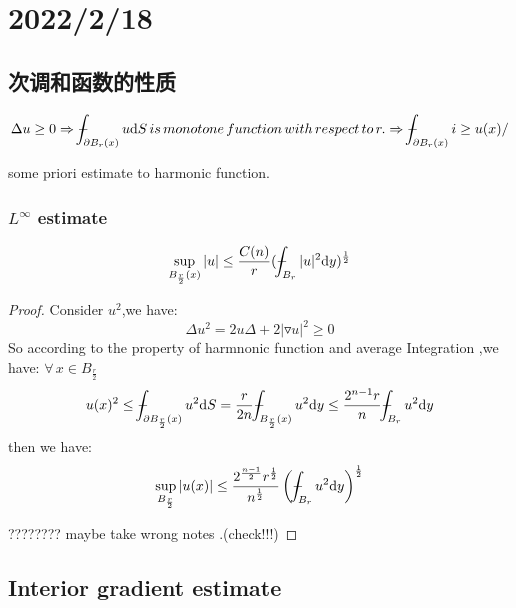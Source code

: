\section{2022/2/18}

\subsection{次调和函数的性质}
\begin{equation*}
    \Delta u\geq 0 \Rightarrow \dashint_{\partial B_r (x)} u\dd S \, is \, monotone \, function \, with \, respect \, to \,r .\Rightarrow \dashint_{\partial B_r (x)} i\geq u(x)/ 
\end{equation*}

some priori estimate to harmonic function.

\subsubsection{$L^{\infty }$ estimate}

\begin{equation*}
    \sup_{B_{\frac{r}{2}}(x)}|u|\leq \frac{C(n)}{r}(\dashint_{B_r}|u|^2 \dd y)^{\frac{1}{2}}
\end{equation*}

\begin{proof}
    Consider $u^2$,we have:
    \begin{equation*}
        \Delta u^2=2u\Delta +2|\triangledown u|^2\geq 0
    \end{equation*}
    So according to the property of harmnonic function and average Integration ,we have:
    $\forall \, x\in B_{\frac{r}{2}}$
    \begin{equation*}
        u(x)^2\leq \dashint_{\partial B_{\frac{r}{2}}(x)}u^2 \dd S=\frac{r}{2n} 
        \dashint_{B_{\frac{r}{2}}(x)}u^2 \dd y \leq \frac{2^{n-1}r}{n}\dashint_{B_r}u^2 \dd y  
    \end{equation*}
then we have:
\begin{equation*}
    \sup_{B_{\frac{r}{2}}}|u(x)|\leq \frac{2^{\frac{n-1}{2}}r^{\frac{1}{2}}}{n^{\frac{1}{2}}}\left(\dashint_{B_r}u^2\dd y\right)^{\frac{1}{2}}
\end{equation*}

???????? maybe take wrong notes .(check!!!)
\end{proof}

\subsection{Interior gradient estimate}

